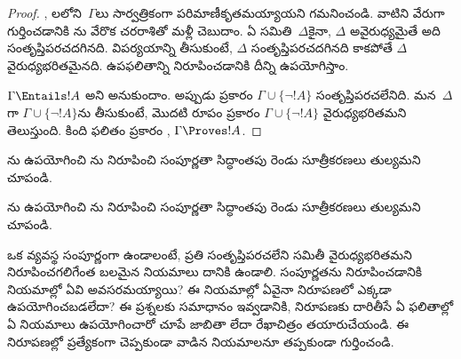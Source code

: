 \documentclass[../../../include/open-logic-section]{subfiles}
\begin{document}
\begin{proof}
, లలోని~$\Gamma$లు
సార్వత్రికంగా పరిమాణీకృతమయ్యాయని గమనించండి. వాటిని వేరుగా గుర్తించడానికి
ను వేరొక చరరాశితో మళ్లీ చెబుదాం. ఏ
 సమితి~$\Delta$కైనా, $\Delta$ అవైరుధ్యమైతే అది
సంతృప్తిపరచదగినది. విపర్యయాన్ని తీసుకుంటే, $\Delta$
సంతృప్తిపరచదగినది కాకపోతే $\Delta$ వైరుధ్యభరితమైనది. ఉపఫలితాన్ని
నిరూపించడానికి దీన్ని ఉపయోగిస్తాం.

$\Gamma \Entails !A$ అని అనుకుందాం. అప్పుడు
 ప్రకారం $\Gamma \cup \{\lnot !A\}$
సంతృప్తిపరచలేనిది. మన~$\Delta$గా $\Gamma \cup \{\lnot !A\}$ను
తీసుకుంటే,  మొదటి రూపం ప్రకారం $\Gamma \cup
\{\lnot !A\}$ వైరుధ్యభరితమని తెలుస్తుంది. కింది ఫలితం ప్రకారం
,
$\Gamma \Proves !A$.
\end{proof}

\begin{prob}
ను ఉపయోగించి
ను నిరూపించి
సంపూర్ణతా సిద్ధాంతపు రెండు సూత్రీకరణలు తుల్యమని చూపండి.
\end{prob}
\tagendprob

\begin{prob}
ను ఉపయోగించి
ను నిరూపించి
సంపూర్ణతా సిద్ధాంతపు రెండు సూత్రీకరణలు తుల్యమని చూపండి.
\end{prob}
\tagendprob

\begin{prob}
ఒక  వ్యవస్థ సంపూర్ణంగా ఉండాలంటే, ప్రతి
సంతృప్తిపరచలేని సమితీ వైరుధ్యభరితమని నిరూపించగలిగేంత బలమైన నియమాలు
దానికి ఉండాలి. సంపూర్ణతను నిరూపించడానికి  నియమాల్లో ఏవి
అవసరమయ్యాయి? ఈ నియమాల్లో ఏవైనా నిరూపణలో ఎక్కడా ఉపయోగించబడలేదా? ఈ
ప్రశ్నలకు సమాధానం ఇవ్వడానికి,
 నిరూపణకు దారితీసే ఏ ఫలితాల్లో
ఏ  నియమాలు ఉపయోగించారో చూపే జాబితా లేదా రేఖాచిత్రం
తయారుచేయండి. ఈ నిరూపణల్లో ప్రత్యేకంగా చెప్పకుండా వాడిన నియమాలనూ తప్పకుండా
గుర్తించండి.
\end{prob}
\tagendprob
\end{document}
